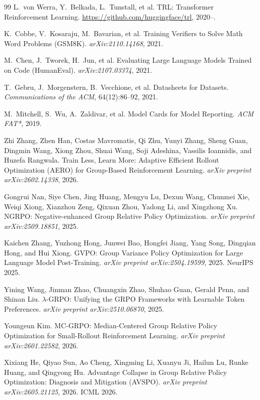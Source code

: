 \documentclass[12pt,a4paper]{report}
\begin{document}
\begin{thebibliography}{99}
L.~von Werra, Y.~Belkada, L.~Tunstall, et al.
\newblock TRL: Transformer Reinforcement Learning.
\newblock \url{https://github.com/huggingface/trl}, 2020--.

K.~Cobbe, V.~Kosaraju, M.~Bavarian, et al.
\newblock Training Verifiers to Solve Math Word Problems (GSM8K).
\newblock \emph{arXiv:2110.14168}, 2021.

M.~Chen, J.~Tworek, H.~Jun, et al.
\newblock Evaluating Large Language Models Trained on Code (HumanEval).
\newblock \emph{arXiv:2107.03374}, 2021.

T.~Gebru, J.~Morgenstern, B.~Vecchione, et al.
\newblock Datasheets for Datasets.
\newblock \emph{Communications of the ACM}, 64(12):86--92, 2021.

M.~Mitchell, S.~Wu, A.~Zaldivar, et al.
\newblock Model Cards for Model Reporting.
\newblock \emph{ACM FAT*}, 2019.


Zhi Zhang, Zhen Han, Costas Mavromatis, Qi Zhu, Yunyi Zhang, Sheng Guan, Dingmin Wang, Xiong Zhou, Shuai Wang, Soji Adeshina, Vassilis Ioannidis, and Huzefa Rangwala.
\newblock Train Less, Learn More: Adaptive Efficient Rollout Optimization (AERO) for Group-Based Reinforcement Learning.
\newblock \emph{arXiv preprint arXiv:2602.14338}, 2026.

Gongrui Nan, Siye Chen, Jing Huang, Mengyu Lu, Dexun Wang, Chunmei Xie, Weiqi Xiong, Xianzhou Zeng, Qixuan Zhou, Yadong Li, and Xingzhong Xu.
\newblock NGRPO: Negative-enhanced Group Relative Policy Optimization.
\newblock \emph{arXiv preprint arXiv:2509.18851}, 2025.

Kaichen Zhang, Yuzhong Hong, Junwei Bao, Hongfei Jiang, Yang Song, Dingqian Hong, and Hui Xiong.
\newblock GVPO: Group Variance Policy Optimization for Large Language Model Post-Training.
\newblock \emph{arXiv preprint arXiv:2504.19599}, 2025. NeurIPS 2025.

Yining Wang, Jinman Zhao, Chuangxin Zhao, Shuhao Guan, Gerald Penn, and Shinan Liu.
\newblock $\lambda$-GRPO: Unifying the GRPO Frameworks with Learnable Token Preferences.
\newblock \emph{arXiv preprint arXiv:2510.06870}, 2025.

Youngeun Kim.
\newblock MC-GRPO: Median-Centered Group Relative Policy Optimization for Small-Rollout Reinforcement Learning.
\newblock \emph{arXiv preprint arXiv:2601.22582}, 2026.

Xixiang He, Qiyao Sun, Ao Cheng, Xingming Li, Xuanyu Ji, Hailun Lu, Runke Huang, and Qingyong Hu.
\newblock Advantage Collapse in Group Relative Policy Optimization: Diagnosis and Mitigation (AVSPO).
\newblock \emph{arXiv preprint arXiv:2605.21125}, 2026. ICML 2026.

\end{thebibliography}
\end{document}
